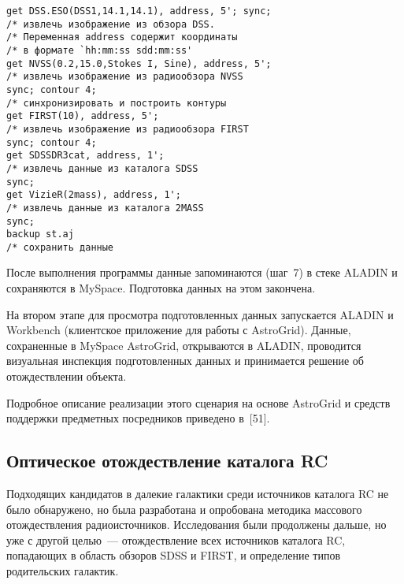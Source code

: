 \begin{multicols}{2}


\noindent
{\small
\begin{verbatim}
get DSS.ESO(DSS1,14.1,14.1), address, 5'; sync; 
/* извлечь изображение из обзора DSS. 
/* Переменная address содержит координаты 
/* в формате `hh:mm:ss sdd:mm:ss'
get NVSS(0.2,15.0,Stokes I, Sine), address, 5'; 
/* извлечь изображение из радиообзора NVSS
sync; contour 4;                                
/* синхронизировать и построить контуры
get FIRST(10), address, 5';                     
/* извлечь изображение из радиообзора FIRST
sync; contour 4;                               
get SDSSDR3cat, address, 1';                    
/* извлечь данные из каталога SDSS
sync; 
get VizieR(2mass), address, 1';                 
/* извлечь данные из каталога 2MASS
sync;
backup st.aj                                    
/* сохранить данные
\end{verbatim}

}


      
После выполнения программы данные запоминаются (шаг~7) в стеке ALADIN и 
сохраняются в MySpace. Подготовка данных на этом закончена. 

      На втором этапе для просмотра подготовленных данных запускается ALADIN и 
Workbench (клиентское приложение для работы с AstroGrid). Данные, сохраненные в 
MySpace AstroGrid, открываются в ALADIN, проводится визуальная инспекция 
подготовленных данных и принимается решение об отождествлении объекта. 
      
      Подробное описание реализации этого сценария на основе AstroGrid и средств 
поддержки предметных посредников приведено в~[51]. 

\subsection{Оптическое отождествление каталога RC} 

      Подходящих кандидатов в далекие галактики среди источников каталога RC не 
было обнаружено, но была разработана и опробована методика массового отождествления 
радиоисточников. Исследования были продолжены дальше, но уже с другой целью~--- 
отождествление всех источников каталога RC, попадающих в область обзоров SDSS и 
FIRST, и определение типов родительских галактик. 
      

\end{multicols}
